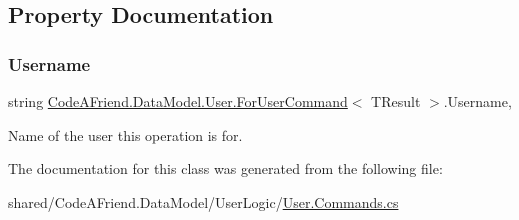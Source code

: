\subsection{Property Documentation}
\mbox{\label{class_code_a_friend_1_1_data_model_1_1_user_1_1_for_user_command_a2c7fef551c3661f0bc712733d1b1380d}} 
\subsubsection{\texorpdfstring{Username}{Username}}
{\footnotesize\ttfamily string \mbox{\hyperlink{class_code_a_friend_1_1_data_model_1_1_user_1_1_for_user_command}{Code\+A\+Friend.\+Data\+Model.\+User.\+For\+User\+Command}}$<$ T\+Result $>$.Username\hspace{0.3cm}{\ttfamily [get]}, {\ttfamily [set]}}



Name of the user this operation is for.



The documentation for this class was generated from the following file\+:\begin{DoxyCompactItemize}
\item 
shared/\+Code\+A\+Friend.\+Data\+Model/\+User\+Logic/\mbox{\hyperlink{_user_8_commands_8cs}{User.\+Commands.\+cs}}\end{DoxyCompactItemize}

